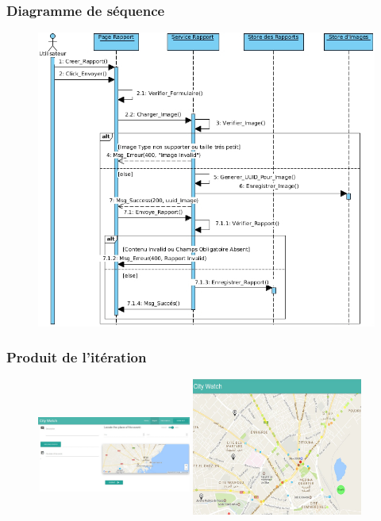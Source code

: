 \documentclass{beamer}
\begin{document}
\begin{frame}
    \frametitle{Diagramme de séquence}
    \begin{figure}
        \includegraphics[width=.8\textwidth]{./diagrams/sprint2-webservices-report-post-sequence}
    \end{figure}
\end{frame}

\begin{frame}
    \frametitle{Produit de l'itération}
    \begin{figure}
        \includegraphics[width=0.45\textwidth,height=4cm]{./figures/sprint2-rapport-screenshot1}
        \includegraphics[width=0.5\textwidth]{./figures/sprint2-dashboard-screenshot2}
    \end{figure}
\end{frame}
\end{document}
